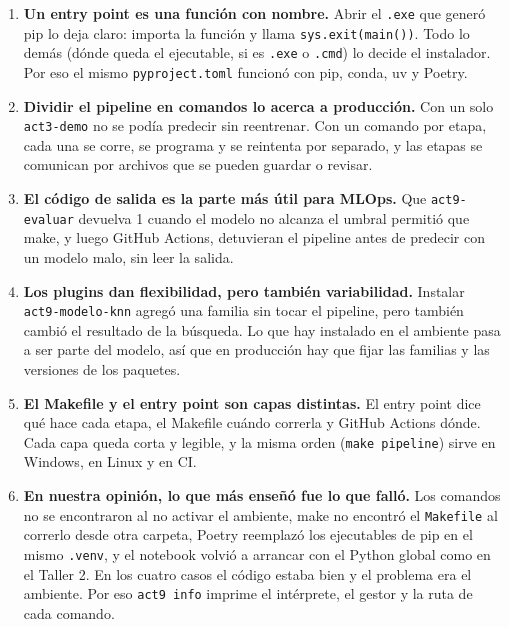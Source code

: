 \documentclass[12pt,a4paper]{article}
\renewcommand{\_}{\guionbajo\allowbreak}
\begin{document}
\begin{enumerate}[leftmargin=1.4em]
\item \textbf{Un entry point es una función con nombre.} Abrir el \texttt{.exe} que generó pip lo
deja claro: importa la función y llama \texttt{sys.exit(main())}. Todo lo demás (dónde queda el
ejecutable, si es \texttt{.exe} o \texttt{.cmd}) lo decide el instalador. Por eso el mismo
\texttt{pyproject.toml} funcionó con pip, conda, uv y Poetry.

\item \textbf{Dividir el pipeline en comandos lo acerca a producción.} Con un solo
\texttt{act3-demo} no se podía predecir sin reentrenar. Con un comando por etapa, cada una se corre,
se programa y se reintenta por separado, y las etapas se comunican por archivos que se pueden
guardar o revisar.

\item \textbf{El código de salida es la parte más útil para MLOps.} Que \texttt{act9-evaluar}
devuelva 1 cuando el modelo no alcanza el umbral permitió que make, y luego GitHub Actions,
detuvieran el pipeline antes de predecir con un modelo malo, sin leer la salida.

\item \textbf{Los plugins dan flexibilidad, pero también variabilidad.} Instalar
\texttt{act9-\allowbreak modelo-\allowbreak knn} agregó una familia sin tocar el pipeline, pero también cambió el resultado
de la búsqueda. Lo que hay instalado en el ambiente pasa a ser parte del modelo, así que en
producción hay que fijar las familias y las versiones de los paquetes.

\item \textbf{El Makefile y el entry point son capas distintas.} El entry point dice qué hace cada
etapa, el Makefile cuándo correrla y GitHub Actions dónde. Cada capa queda corta y legible, y la
misma orden (\texttt{make pipeline}) sirve en Windows, en Linux y en CI.

\item \textbf{En nuestra opinión, lo que más enseñó fue lo que falló.} Los comandos no se
encontraron al no activar el ambiente, make no encontró el \texttt{Makefile} al correrlo desde otra
carpeta, Poetry reemplazó los ejecutables de pip en el mismo \texttt{.venv}, y el notebook volvió a
arrancar con el Python global como en el Taller 2. En los cuatro casos el código estaba bien y el
problema era el ambiente. Por eso \texttt{act9 info} imprime el
intérprete, el gestor y la ruta de cada comando.
\end{enumerate}
\end{document}
